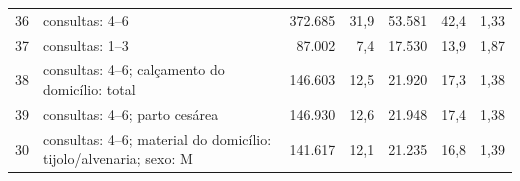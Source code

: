 \begin{table}[H]
\begin{tabularx}{\textwidth}{@{}c Y r r r r r@{}}
36 & consultas: 4--6 & 372.685 & 31,9 & 53.581 & 42,4 & 1,33 \\
37 & consultas: 1--3 & 87.002 & 7,4 & 17.530 & 13,9 & 1,87 \\
38 & consultas: 4--6; calçamento do domicílio: total & 146.603 & 12,5 & 21.920 & 17,3 & 1,38 \\
39 & consultas: 4--6; parto cesárea & 146.930 & 12,6 & 21.948 & 17,4 & 1,38 \\
30 & consultas: 4--6; material do domicílio: tijolo/alvenaria; sexo: M & 141.617 & 12,1 & 21.235 & 16,8 & 1,39 \\
\bottomrule
\end{tabularx}
\end{table}







